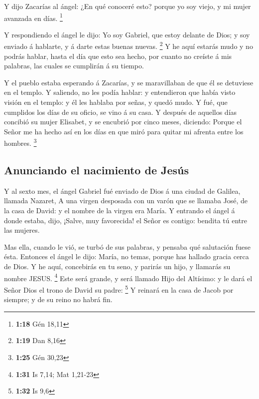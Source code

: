  Y dijo Zacarías al ángel: ¿En qué conoceré esto? porque
yo soy viejo, y mi mujer avanzada en días. \footnote{\textbf{1:18} Gén
  18,11}

 Y respondiendo el ángel le dijo: Yo soy Gabriel, que
estoy delante de Dios; y soy enviado á hablarte, y á darte estas buenas
nuevas. \footnote{\textbf{1:19} Dan 8,16}  Y he aquí
estarás mudo y no podrás hablar, hasta el día que esto sea hecho, por
cuanto no creíste á mis palabras, las cuales se cumplirán á su tiempo.

 Y el pueblo estaba esperando á Zacarías, y se
maravillaban de que él se detuviese en el templo.  Y
saliendo, no les podía hablar: y entendieron que había visto visión en
el templo: y él les hablaba por señas, y quedó mudo.  Y
fué, que cumplidos los días de su oficio, se vino á su casa.
 Y después de aquellos días concibió su mujer Elisabet, y
se encubrió por cinco meses, diciendo:  Porque el Señor
me ha hecho así en los días en que miró para quitar mi afrenta entre los
hombres. \footnote{\textbf{1:25} Gén 30,23}

\hypertarget{anunciando-el-nacimiento-de-jesuxfas}{%
\subsection{Anunciando el nacimiento de
Jesús}\label{anunciando-el-nacimiento-de-jesuxfas}}

 Y al sexto mes, el ángel Gabriel fué enviado de Dios á
una ciudad de Galilea, llamada Nazaret,  A una virgen
desposada con un varón que se llamaba José, de la casa de David: y el
nombre de la virgen era María.  Y entrando el ángel á
donde estaba, dijo, ¡Salve, muy favorecida! el Señor es contigo: bendita
tú entre las mujeres.

 Mas ella, cuando le vió, se turbó de sus palabras, y
pensaba qué salutación fuese ésta.  Entonces el ángel le
dijo: María, no temas, porque has hallado gracia cerca de Dios.
 Y he aquí, concebirás en tu seno, y parirás un hijo, y
llamarás su nombre JESUS. \footnote{\textbf{1:31} Is 7,14; Mat 1,21-23}
 Este será grande, y será llamado Hijo del Altísimo: y le
dará el Señor Dios el trono de David su padre: \footnote{\textbf{1:32}
  Is 9,6}  Y reinará en la casa de Jacob por siempre; y
de su reino no habrá fin.

